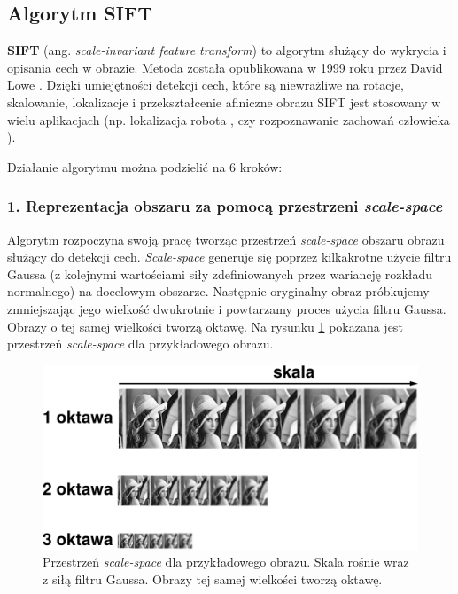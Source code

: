 \subsection{Algorytm SIFT}
\label{sec:proponowane_algorytmy:sift}

\textbf{SIFT} (ang. \textit{scale-invariant feature transform}) to algorytm służący do wykrycia i opisania cech w obrazie. Metoda została opublikowana w 1999 roku przez David Lowe \cite{Lowe:2004:DIF:993451.996342}. Dzięki umiejętności detekcji cech, które są niewrażliwe na rotacje, skalowanie, lokalizacje i przekształcenie afiniczne obrazu SIFT jest stosowany w wielu aplikacjach (np. lokalizacja robota \cite{conf/icra/2001}, czy rozpoznawanie zachowań człowieka \cite{Laptev:2007:LVM:1314710.1314906}).

Działanie algorytmu można podzielić na 6 kroków:

\subsubsection{1. Reprezentacja obszaru za pomocą przestrzeni \textit{scale-space}}
\label{sec:proponowane_algorytmy:scale_space}

Algorytm rozpoczyna swoją pracę tworząc przestrzeń \textit{scale-space} obszaru obrazu służący do detekcji cech. \textit{Scale-space} generuje się poprzez kilkakrotne użycie filtru Gaussa (z kolejnymi wartościami siły zdefiniowanych przez wariancję rozkładu normalnego) na docelowym obszarze. Następnie oryginalny obraz próbkujemy zmniejszając jego wielkość dwukrotnie i powtarzamy proces użycia filtru Gaussa. Obrazy o tej samej wielkości tworzą oktawę. Na rysunku \ref{fig:proponowane_algorytmy:scale_space_fig} pokazana jest przestrzeń \textit{scale-space} dla przykładowego obrazu.

\begin{figure}[htb]
  \centering
  \includegraphics[width=\textwidth]{gfx/scale_space}
  \caption{Przestrzeń \textit{scale-space} dla przykładowego obrazu. Skala rośnie wraz z siłą filtru Gaussa. Obrazy tej samej wielkości tworzą oktawę.}
  \label{fig:proponowane_algorytmy:scale_space_fig}
\end{figure}

